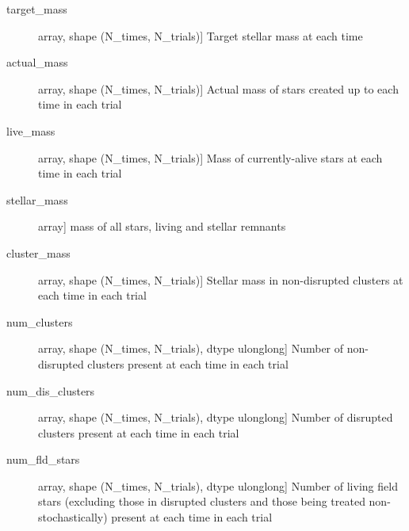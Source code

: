 \documentclass[letterpaper,10pt,english]{sphinxmanual}
\begin{document}
\begin{fulllineitems}
\begin{description}
\begin{description}
\item[{target\_mass}] \leavevmode{[}array, shape (N\_times, N\_trials){]}
Target stellar mass at each time

\item[{actual\_mass}] \leavevmode{[}array, shape (N\_times, N\_trials){]}
Actual mass of stars created up to each time in each trial

\item[{live\_mass}] \leavevmode{[}array, shape (N\_times, N\_trials){]}
Mass of currently-alive stars at each time in each trial

\item[{stellar\_mass}] \leavevmode{[}array{]}
mass of all stars, living and stellar remnants

\item[{cluster\_mass}] \leavevmode{[}array, shape (N\_times, N\_trials){]}
Stellar mass in non-disrupted clusters at each time in each
trial

\item[{num\_clusters}] \leavevmode{[}array, shape (N\_times, N\_trials), dtype ulonglong{]}
Number of non-disrupted clusters present at each time in each
trial

\item[{num\_dis\_clusters}] \leavevmode{[}array, shape (N\_times, N\_trials), dtype ulonglong{]}
Number of disrupted clusters present at each time in each trial

\item[{num\_fld\_stars}] \leavevmode{[}array, shape (N\_times, N\_trials), dtype ulonglong{]}
Number of living field stars (excluding those in disrupted 
clusters and those being treated non-stochastically) present at
each time in each trial

\end{description}

\end{description}

\end{fulllineitems}

\end{document}
